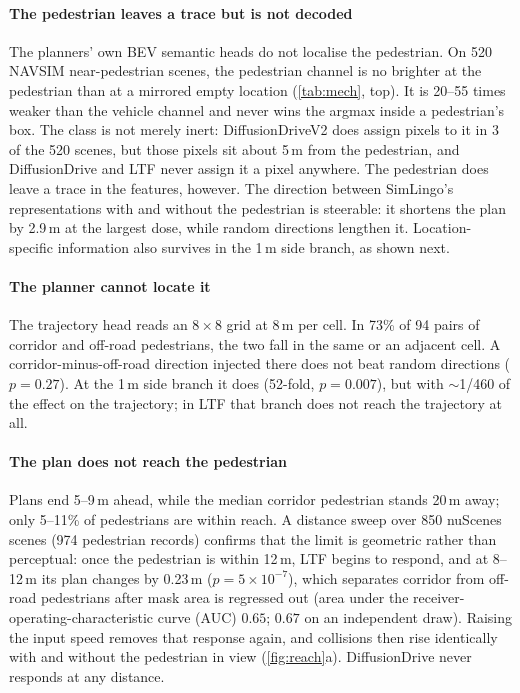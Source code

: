 \paragraph{The pedestrian leaves a trace but is not decoded}
The planners' own BEV semantic heads do not localise the pedestrian. On 520 NAVSIM near-pedestrian
scenes, the pedestrian channel is no brighter at the pedestrian than at a mirrored empty location
(\cref{tab:mech}, top). It is 20--55 times weaker than the vehicle channel and never wins the argmax
inside a pedestrian's box. The class is not merely inert: DiffusionDriveV2 does assign pixels to it in
3 of the 520 scenes, but those pixels sit about 5\,m from the pedestrian, and DiffusionDrive and LTF
never assign it a pixel anywhere. The pedestrian does leave a trace in the features, however. The direction
between SimLingo's representations with and without the pedestrian is steerable: it shortens the plan
by 2.9\,m at the largest dose, while random directions lengthen it. Location-specific information also
survives in the 1\,m side branch, as shown next.

\paragraph{The planner cannot locate it}
The trajectory head reads an $8\times8$ grid at 8\,m per cell. In 73\% of 94 pairs of corridor and
off-road pedestrians, the two fall in the same or an adjacent cell. A corridor-minus-off-road direction
injected there does not beat random directions ($p=0.27$). At the 1\,m side branch it does (52-fold,
$p=0.007$), but with $\sim$1/460 of the effect on the trajectory; in LTF that branch does not reach
the trajectory at all.

\paragraph{The plan does not reach the pedestrian}
Plans end 5--9\,m ahead, while the median corridor pedestrian stands 20\,m away; only 5--11\% of
pedestrians are within reach. A distance sweep over 850 nuScenes scenes (974 pedestrian
records) confirms that the limit is geometric rather than perceptual: once the pedestrian is within
12\,m, LTF begins to respond, and at 8--12\,m its plan changes by 0.23\,m ($p=5\times10^{-7}$), which
separates corridor from off-road pedestrians after mask area is regressed out (area under the receiver-operating-characteristic curve (AUC) $0.65$; $0.67$ on an
independent draw). Raising the input speed removes that response again, and collisions then rise
identically with and without the pedestrian in view (\cref{fig:reach}a). DiffusionDrive never responds
at any distance.
